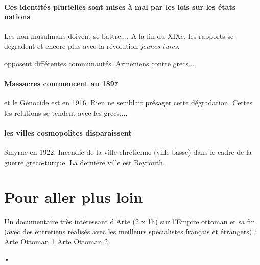  \paragraph{Ces identités plurielles sont mises à mal par les lois sur les états nations} Les non musulmans doivent se battre,... A la fin du XIXè, les rapports se dégradent et encore plus avec la révolution \textit{jeunes turcs}. 
 \begin{Ex}
     opposent différentes communautés. Arméniens contre grecs...
 \end{Ex}

 \paragraph{Massacres commencent au 1897} et le Génocide est en 1916. Rien ne semblait présager cette dégradation. Certes les relations se tendent avec les grecs,...

 \paragraph{les villes cosmopolites disparaissent} Smyrne en 1922. Incendie de la ville chrétienne (ville basse) dans le cadre de la guerre greco-turque. 
 La dernière ville est Beyrouth. 


 \section{Pour aller plus loin}

 Un documentaire très intéressant d’Arte (2 x 1h) sur l’Empire ottoman
et sa fin (avec des entretiens réalisés avec les meilleurs spécialistes
français et étrangers) :
\href{https://www.dailymotion.com/video/x4a7vu8}{Arte Ottoman 1}
\href{Https://www.dailymotion.com/video/x3zpz4e}{Arte Ottoman 2}

•
